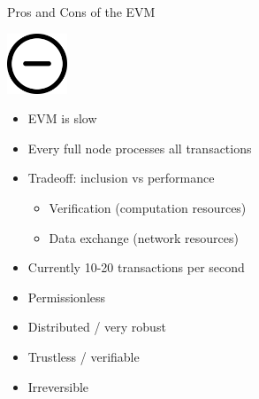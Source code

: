 \documentclass[handout]{beamer}
\begin{document}
\begin{frame}{Pros and Cons of the EVM}

\begin{minipage}{0.15\textwidth}
		\center
		\vspace{3.5em}
		\includegraphics[width=1.8cm]{../assets/images/minus.png}
		
		\vspace{3.5em}
		\vspace{0.5em}
	\end{minipage}
    \hfill
	\begin{minipage}{0.7\textwidth}
	\vspace{1em}

		\begin{itemize}
			\item<1-> EVM is slow
			\item<1-> Every full node processes all transactions
			\item<1-> Tradeoff: inclusion vs performance
			\begin{itemize}				
    				\item<1-> Verification (computation resources)
    				\item<1-> Data exchange (network resources)
  			\end{itemize}
			\item<1-> Currently 10-20 transactions per second	
		\end{itemize}
		\vspace{1em}

		\begin{itemize}
			\item<2-> Permissionless
			\item<2-> Distributed / very robust
			\item<2-> Trustless / verifiable
			\item<2-> Irreversible


		\end{itemize}
	\end{minipage}
	
	

\end{frame}
\end{document}
